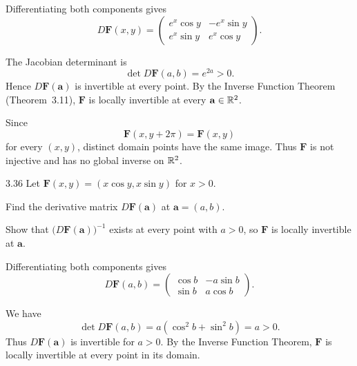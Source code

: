\documentclass[11pt,oneside]{article}
\begin{document}
\begin{solution}
\begin{problemsubparts}
    \item Differentiating both components gives
    \[
        \boxed{D\mathbf F(x,y)=
        \begin{pmatrix}
            e^x\cos y & -e^x\sin y\\
            e^x\sin y & e^x\cos y
        \end{pmatrix}}.
    \]

    \item The Jacobian determinant is
    \[
        \boxed{\det D\mathbf F(a,b)=e^{2a}>0}.
    \]
    Hence $D\mathbf F(\mathbf a)$ is invertible at every point. By the Inverse Function Theorem (Theorem~3.11), $\mathbf F$ is locally invertible at every $\mathbf a\in\mathbb{R}^2$.

    \item Since
    \[
        \mathbf F(x,y+2\pi)=\mathbf F(x,y)
    \]
    for every $(x,y)$, distinct domain points have the same image. Thus $\mathbf F$ is not injective and has no global inverse on $\mathbb{R}^2$.
\end{problemsubparts}
\end{solution}

\begin{problem}{3.36}
Let $\mathbf F(x,y)=(x\cos y,x\sin y)$ for $x>0$.
\begin{problemsubparts}
    \item Find the derivative matrix $D\mathbf F(\mathbf a)$ at $\mathbf a=(a,b)$.
    \item Show that $\bigl(D\mathbf F(\mathbf a)\bigr)^{-1}$ exists at every point with $a>0$, so $\mathbf F$ is locally invertible at $\mathbf a$.
\end{problemsubparts}
\end{problem}

\begin{solution}
\begin{problemsubparts}
    \item Differentiating both components gives
    \[
        \boxed{D\mathbf F(a,b)=
        \begin{pmatrix}
            \cos b & -a\sin b\\
            \sin b & a\cos b
        \end{pmatrix}}.
    \]

    \item We have
    \[
        \boxed{\det D\mathbf F(a,b)=a(\cos^2b+\sin^2b)=a>0}.
    \]
    Thus $D\mathbf F(\mathbf a)$ is invertible for $a>0$. By the Inverse Function Theorem, $\mathbf F$ is locally invertible at every point in its domain.
\end{problemsubparts}
\end{solution}
\end{document}
